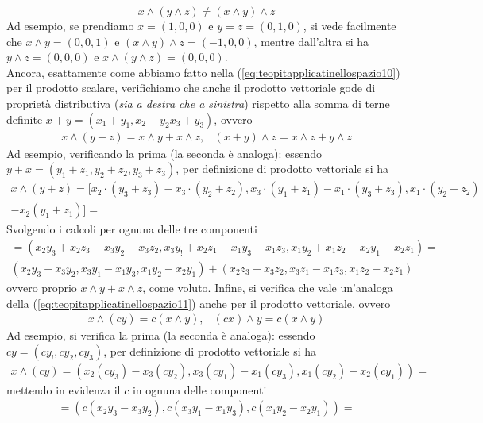 \documentclass{book}
\theoremstyle{definition}
\theoremstyle{plain}
\begin{document}
\begin{equation*}
  x\wedge (y\wedge z)\neq (x\wedge y) \wedge z
\end{equation*}
Ad esempio, se prendiamo $x=(1,0,0)$ e $y=z=(0,1,0)$, si vede facilmente che $x\wedge y = (0,0,1)$ e $(x\wedge y) \wedge z=(-1,0,0)$, mentre dall'altra si ha $y\wedge z=(0,0,0)$ e $x\wedge (y\wedge z)=(0,0,0)$.\\
Ancora, esattamente come abbiamo fatto nella (\ref{eq:teopitapplicatinellospazio10}) per il prodotto scalare, verifichiamo che anche il prodotto vettoriale gode di proprietà distributiva (\textit{sia a destra che a sinistra}) rispetto alla somma di terne definite $x+y=(x_1+y_1,x_2+y_2x_3+y_3)$, ovvero
\begin{eqnarray}
  \label{eq:teopitapplicatinellospazio13}
  x\wedge (y+z)=x\wedge y +x \wedge z, & (x+y)\wedge z= x\wedge z+y\wedge z
\end{eqnarray}
Ad esempio, verificando la prima (la seconda è analoga): essendo $y+x=(y_1+z_1,y_2+z_2,y_3+z_3)$, per definizione di prodotto vettoriale si ha
\begin{eqnarray*}
  x\wedge (y+z)= [x_2\cdot(y_3+z_3)-x_3\cdot(y_2+z_2),x_3\cdot(y_1+z_1)
  -x_1\cdot (y_3+z_3),x_1\cdot(y_2+z_2)\\-x_2(y_1+z_1)]=
\end{eqnarray*}
Svolgendo i calcoli per ognuna delle tre componenti
\begin{eqnarray*}
  =(x_2y_3+x_2z_3-x_3y_2-x_3z_2,x_3y_!+x_2z_1-x_1y_3-x_1z_3, x_1y_2+x_1z_2-x_2y_1-x_2z_1)=\\
  (x_2y_3-x_3y_2,x_3y_1-x_1y_3,x_1y_2-x_2y_1)+(x_2z_3-x_3z_2,x_3z_1-x_1z_3,x_1z_2-x_2z_1)
\end{eqnarray*}
ovvero proprio $x\wedge y+x\wedge z$, come voluto. Infine, si verifica che vale un'analoga della (\ref{eq:teopitapplicatinellospazio11}) anche per il prodotto vettoriale, ovvero
\begin{eqnarray}
  \label{eq:teopitapplicatinellospazio14}
  x\wedge (cy)=c(x\wedge y), & (cx)\wedge y =c(x\wedge y)
\end{eqnarray}
Ad esempio, si verifica la prima (la seconda è analoga): essendo $cy=(cy_!,cy_2,cy_3)$, per definizione di prodotto vettoriale si ha
\begin{eqnarray*}
  x\wedge (cy)=(x_2(cy_3)-x_3(cy_2),x_3(cy_1)-x_1(cy_3),x_1(cy_2)-x_2(cy_1))=
\end{eqnarray*}
mettendo in evidenza il $c$ in ognuna delle componenti
\begin{eqnarray*}
  =(c(x_2y_3-x_3y_2),c(x_3y_1-x_1y_3),c(x_1y_2-x_2y_1))=
\end{eqnarray*}
\end{document}
